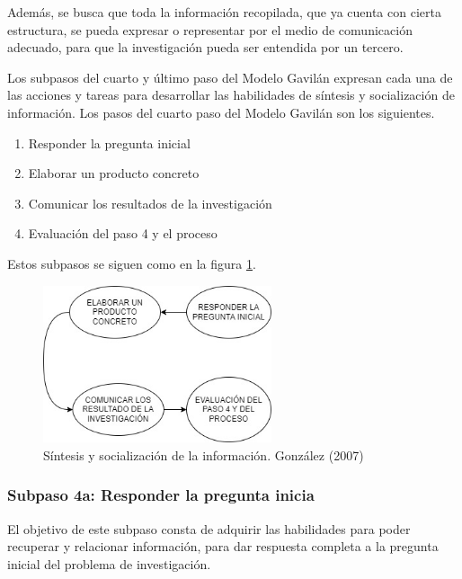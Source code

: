 Además, se busca que toda la información recopilada, que ya cuenta con cierta estructura, se pueda expresar o representar por el medio de comunicación adecuado, para que la investigación pueda ser entendida por un tercero.

Los subpasos del cuarto y último paso del Modelo Gavilán expresan cada una de las acciones y tareas para desarrollar las habilidades de síntesis y socialización de información. Los pasos del cuarto paso del Modelo Gavilán son los siguientes.

\begin{enumerate}
  \item Responder la pregunta inicial
  \item Elaborar un producto concreto
  \item Comunicar los resultados de la investigación
  \item Evaluación del paso 4 y el proceso
\end{enumerate}

Estos subpasos se siguen como en la figura \ref{fig:26}.

\begin{figure}[H]
  \centering
  \includegraphics[width=0.60\textwidth]{Cap2/Figuras/Síntesis y socialización de información.jpg}
  \caption{Síntesis y socialización de la información. González (2007)}
  \label{fig:26}
\end{figure}


\subsubsection{Subpaso 4a: Responder la pregunta inicia}
\label{secPaso4aCap2}

El objetivo de este subpaso consta de adquirir las habilidades para poder recuperar y relacionar información, para dar respuesta completa a la pregunta inicial del problema de investigación.

